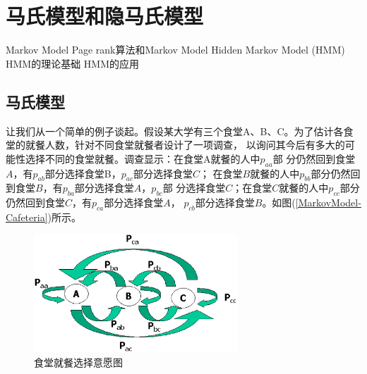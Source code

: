 \chapter{马氏模型和隐马氏模型}

Markov Model
Page rank算法和Markov Model
Hidden Markov Model (HMM)
HMM的理论基础
HMM的应用

\section{马氏模型}

让我们从一个简单的例子谈起。假设某大学有三个食堂A、B、C。为了估计各食堂的就餐人数，针对不同食堂就餐者设计了一项调查，
以询问其今后有多大的可能性选择不同的食堂就餐。调查显示：在食堂A就餐的人中$p_{aa}$部
分仍然回到食堂$A$，有$p_{ab}$部分选择食堂B，$p_{ac}$部分选择食堂$C$；
在食堂$B$就餐的人中$p_{bb}$部分仍然回到食堂$B$，有$p_{ba}$部分选择食堂$A$，$p_{bc}$部
分选择食堂$C$；在食堂$C$就餐的人中$p_{cc}$部分仍然回到食堂$C$，有$p_{ca}$部分选择食堂$A$，
$p_{cb}$部分选择食堂$B$。如图(\ref{MarkovModel-Cafeteria})所示。
\begin{figure}[ht]
\centering
\includegraphics[width=3in]{MarkovModel-Cafeteria.eps}
\caption{食堂就餐选择意愿图} \label{Fig:MarkovModel-Cafeteria}
\end{figure}

